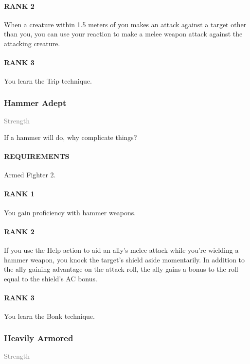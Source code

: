 \paragraph{RANK 2} When a creature within 1.5 meters of you makes an attack against a target other than you, you can use your reaction to make a melee weapon attack against the attacking creature.
\paragraph{RANK 3} You learn the Trip technique.

\subsubsection{Hammer Adept} \label{feat::hammeradept}
\small{\textcolor{gray}{Strength}}

\normalsize
If a hammer will do, why complicate things?
\paragraph{REQUIREMENTS} Armed Fighter 2.
\paragraph{RANK 1} You gain proficiency with hammer weapons.
\paragraph{RANK 2} If you use the Help action to aid an ally's melee attack while you're wielding a hammer weapon, you knock the target's shield aside momentarily.
In addition to the ally gaining advantage on the attack roll, the ally gains a bonus to the roll equal to the shield's AC bonus.
\paragraph{RANK 3} You learn the Bonk technique.

\subsubsection{Heavily Armored} \label{feat::heavilyarmored}
\small{\textcolor{gray}{Strength}}


